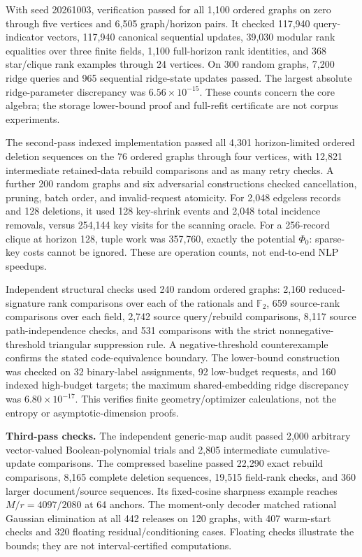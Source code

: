 \documentclass[11pt,a4paper]{article}
\theoremstyle{definition}\newtheorem{definition}[theorem]{Definition}
\begin{document}
With seed 20261003, verification passed for all 1,100 ordered graphs on zero through five vertices and 6,505 graph/horizon pairs. It checked 117,940 query-indicator vectors, 117,940 canonical sequential updates, 39,030 modular rank equalities over three finite fields, 1,100 full-horizon rank identities, and 368 star/clique rank examples through 24 vertices. On 300 random graphs, 7,200 ridge queries and 965 sequential ridge-state updates passed. The largest absolute ridge-parameter discrepancy was $6.56\times10^{-15}$. These counts concern the core algebra; the storage lower-bound proof and full-refit certificate are not corpus experiments.

The second-pass indexed implementation passed all 4,301 horizon-limited ordered deletion sequences on the 76 ordered graphs through four vertices, with 12,821 intermediate retained-data rebuild comparisons and as many retry checks. A further 200 random graphs and six adversarial constructions checked cancellation, pruning, batch order, and invalid-request atomicity. For 2,048 edgeless records and 128 deletions, it used 128 key-shrink events and 2,048 total incidence removals, versus 254,144 key visits for the scanning oracle. For a 256-record clique at horizon 128, tuple work was 357,760, exactly the potential $\Phi_0$: sparse-key costs cannot be ignored. These are operation counts, not end-to-end NLP speedups.

Independent structural checks used 240 random ordered graphs: 2,160 reduced-signature rank comparisons over each of the rationals and $\mathbb F_2$, 659 source-rank comparisons over each field, 2,742 source query/rebuild comparisons, 8,117 source path-independence checks, and 531 comparisons with the strict nonnegative-threshold triangular suppression rule. A negative-threshold counterexample confirms the stated code-equivalence boundary. The lower-bound construction was checked on 32 binary-label assignments, 92 low-budget requests, and 160 indexed high-budget targets; the maximum shared-embedding ridge discrepancy was $6.80\times10^{-17}$. This verifies finite geometry/optimizer calculations, not the entropy or asymptotic-dimension proofs.

\textbf{Third-pass checks.} The independent generic-map audit passed 2,000 arbitrary vector-valued Boolean-polynomial trials and 2,805 intermediate cumulative-update comparisons. The compressed baseline passed 22,290 exact rebuild comparisons, 8,165 complete deletion sequences, 19,515 field-rank checks, and 360 larger document/source sequences. Its fixed-cosine sharpness example reaches $M/r=4097/2080$ at 64 anchors. The moment-only decoder matched rational Gaussian elimination at all 442 releases on 120 graphs, with 407 warm-start checks and 320 floating residual/conditioning cases. Floating checks illustrate the bounds; they are not interval-certified computations.
\end{document}
